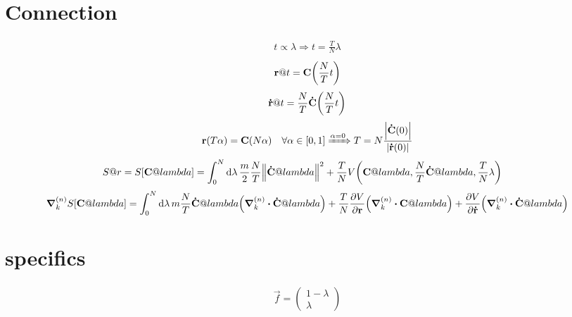 \documentclass{article}
\begin{document}
\section{Connection}

\def\curve@t{\curve\qty(\frac NT t)}
\def\dcurve@t{\dcurve\qty(\frac NT t)}

\def\r@alpha{\r\qty(T\alpha)}
\def\curve@alpha{\curve\qty(N\alpha)}
\def\dr@alpha{\dr\qty(T\alpha)}
\def\dcurve@alpha{\dcurve\qty(N\alpha)}

\def\int@lambda{\int^N_0 \dd{\lambda}}
\def\action@curve{\action\qty[\curve@lambda]}
\def\potential@lambda{\potential\qty(\curve@lambda, \frac NT \dcurve@lambda, \frac TN \lambda)}

\begin{align*}
    t \propto \lambda \Rightarrow t = \frac TN \lambda
\end{align*}
\begin{align*}
    \r@t = 
    \curve@t
\end{align*}
\begin{align*}
    \dr@t = 
    \frac NT \dcurve@t
\end{align*}
\begin{align*}
    \r@alpha = \curve@alpha \quad\forall \alpha \in \qty[0, 1] \xRightarrow{\alpha = 0}
    T = N \frac{\abs{\dcurve\qty(0)}}{\abs{\dr\qty(0)}}
\end{align*}
\begin{align*}
    \action@r = 
    \action@curve &= 
    \int@lambda \frac  m2 \frac NT \norm{\dcurve@lambda}^2 + \frac TN \potential@lambda
\end{align*}
\begin{align*}
    \cgrad\action@curve =
    \int@lambda m \frac NT \dcurve@lambda \qty(\cdiv\dcurve@lambda) +
    \frac TN \pdv{\potential}{\r} \qty(\cdiv\curve@lambda) +
    \pdv{\potential}{\dr} \qty(\cdiv\dcurve@lambda)
\end{align*}


\section{specifics}

\def\vbasis{\vec{f}}

\begin{align*}
    \vbasis = 
    \begin{pmatrix}
        1 - \lambda \\
        \lambda
    \end{pmatrix}
\end{align*}
\end{document}
